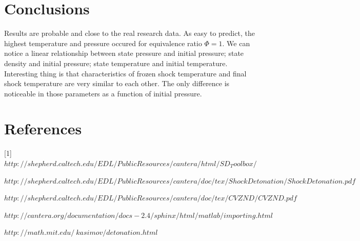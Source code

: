 \documentclass[a4paper]{article}
\newcommand{\sepspace}{\vspace*{1em}}
\begin{document}
\section{Conclusions}

Results are probable and close to the real research data. As easy to predict, the highest temperature and pressure occured for equivalence ratio $\Phi = 1$. We can notice a linear relationship between state pressure and initial pressure; state density and initial pressure; state temperature and initial temperature. Interesting thing is that characteristics of frozen shock temperature and final shock temperature are very similar to each other. The only difference is noticeable in those parameters as a function of initial pressure.

\sepspace

\sepspace

\sepspace

\section{References}


[1] 
$http://shepherd.caltech.edu/EDL/PublicResources/cantera/html/SD_Toolbox/
$

\noindent
[2] 
$http://shepherd.caltech.edu/EDL/PublicResources/cantera/doc/tex/ShockDetonation/ShockDetonation.pdf
$

\noindent
[3] 
$http://shepherd.caltech.edu/EDL/PublicResources/cantera/doc/tex/CVZND/CVZND.pdf
$

\noindent
[4] 
$http://cantera.org/documentation/docs-2.4/sphinx/html/matlab/importing.html
$

\noindent
[5] 
$http://math.mit.edu/~kasimov/detonation.html
$
\end{document}
